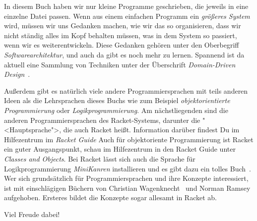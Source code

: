 In diesem Buch haben wir nur kleine Programme geschrieben, die
  jeweils in eine einzelne Datei passen.  Wenn aus einem einfachen
  Programm ein \emph{größeres System} wird, müssen wir uns Gedanken machen,
  wie wir das so organisieren, dass wir nicht ständig alles im Kopf
  behalten müssen, was in dem System so passiert, wenn wir es
  weiterentwickeln.  Diese Gedanken gehören unter den Oberbegriff
  \textit{Softwarearchitektur}, und auch da
  gibt es noch mehr zu lernen.  Spannend ist da aktuell eine Sammlung
  von Techniken unter der Überschrift \textit{Domain-Driven
    Design}~\cite{Evans2004}.

Außerdem gibt es natürlich viele andere Programmiersprachen mit teils
anderen Ideen als die Lehrsprachen dieses Buchs wie zum Beispiel
\emph{objektorientierte Programmierung} oder \emph{Logikprogrammierung}.  Am
nächstliegenden sind die anderen Programmiersprachen des
Racket-Systems, darunter die "<Hauptsprache">, die auch Racket heißt.
Information darüber findest Du im Hilfezentrum im \textit{Racket
  Guide} Auch für objektoriente Programmierung ist Racket ein guter
Ausgangspunkt, schau im Hilfezentrum in den Racket Guide unter
\textit{Classes and Objects}.  Bei Racket lässt sich auch die Sprache
für Logikprogrammierung \textit{MiniKanren} installieren und es gibt
dazu ein tolles Buch~\cite{FriedmanEtAl2018}.  Wer sich grundsätzlich
für Programmiersprachen und ihre Konzepte interessiert, ist mit
einschlägigen Büchern von Christian Wagenknecht~\cite{Wagenknecht2016}
und Norman Ramsey~\cite{Ramsey2022} aufgehoben.  Ersteres bildet die
Konzepte sogar allesamt in Racket ab.

Viel Freude dabei!


